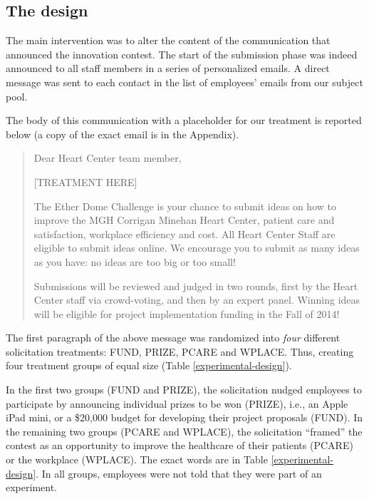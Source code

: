 \documentclass[11pt, titlepage]{article}
\begin{document}
\subsection{The design}\label{the-design}

The main intervention was to alter the content of the communication that
announced the innovation contest. The start of the submission phase was
indeed announced to all staff members in a series of personalized
emails. A direct message was sent to each contact in the list of
employees' emails from our subject pool.

The body of this communication with a placeholder for our treatment is
reported below (a copy of the exact email is in the Appendix).

\begin{quote}
Dear Heart Center team member,

{[}TREATMENT HERE{]}

The Ether Dome Challenge is your chance to submit ideas on how to
improve the MGH Corrigan Minehan Heart Center, patient care and
satisfaction, workplace efficiency and cost. All Heart Center Staff are
eligible to submit ideas online. We encourage you to submit as many
ideas as you have: no ideas are too big or too small!

Submissions will be reviewed and judged in two rounds, first by the
Heart Center staff via crowd-voting, and then by an expert panel.
Winning ideas will be eligible for project implementation funding in the
Fall of 2014!
\end{quote}

The first paragraph of the above message was randomized into \emph{four}
different solicitation treatments: FUND, PRIZE, PCARE and WPLACE. Thus,
creating four treatment groups of equal size (Table
\ref{experimental-design}).

In the first two groups (FUND and PRIZE), the solicitation nudged
employees to participate by announcing individual prizes to be won
(PRIZE), i.e., an Apple iPad mini, or a \$20,000 budget for developing
their project proposals (FUND). In the remaining two groups (PCARE and
WPLACE), the solicitation ``framed'' the contest as an opportunity to
improve the healthcare of their patients (PCARE) or the workplace
(WPLACE). The exact words are in Table \ref{experimental-design}. In all
groups, employees were not told that they were part of an experiment.
\end{document}
